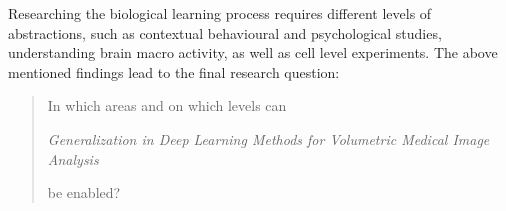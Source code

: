     Researching the biological learning process requires different levels of abstractions, such as contextual behavioural and psychological studies, understanding brain macro activity, as well as cell level experiments.
    The above mentioned findings lead to the final research question:

    \begin{quote}
        \centering \Large
        In which areas and on which levels can

        \noindent \emph{Generalization in Deep Learning Methods for Volumetric Medical Image Analysis}

        \noindent be enabled?
    \end{quote}








